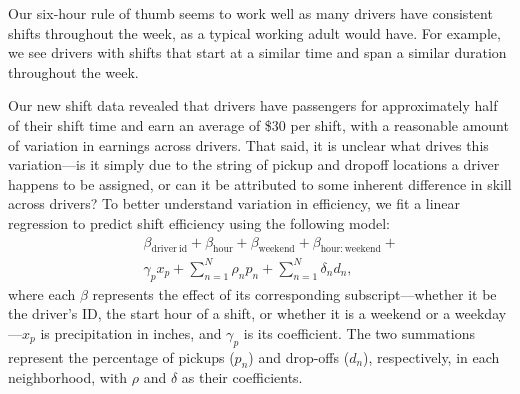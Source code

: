 \documentclass[twocolumn]{article}
\begin{document}
Our six-hour rule of thumb seems to work well as many drivers have consistent shifts throughout the week, as a typical working adult 
would have. For example, we see drivers with shifts that start at a similar time and span a similar duration throughout the week.



Our new shift data revealed that drivers have passengers for approximately half of their shift time and earn an average of \$30 per shift, with a reasonable amount of variation in earnings across drivers.
That said, it is unclear what drives this variation---is it simply due to the string of pickup and dropoff locations a driver happens to be assigned, or can it be attributed to some inherent difference in skill across drivers?
To better understand variation in efficiency, we fit a linear regression to predict shift efficiency using the following model:
\begin{eqnarray*}
&& \beta_{\mathrm{driver~id}} + \beta_{\mathrm{hour}} + \beta_{\mathrm{weekend}} + \beta_{\mathrm{hour:weekend}} + \\
  & & \gamma_p x_p + \sum_{n=1}^N \rho_n p_n + \sum_{n=1}^N \delta_n d_n,
\end{eqnarray*}
where each $\beta$ represents the effect of its corresponding subscript---whether it be the driver's ID, the start hour of a shift, or whether it is a weekend or a weekday---$x_p$ is precipitation in inches, and $\gamma_p$ is its coefficient. The two summations represent the percentage of pickups ($p_n$) and drop-offs ($d_n$), respectively, in each neighborhood, with $\rho$ and $\delta$ as their coefficients.
\end{document}
